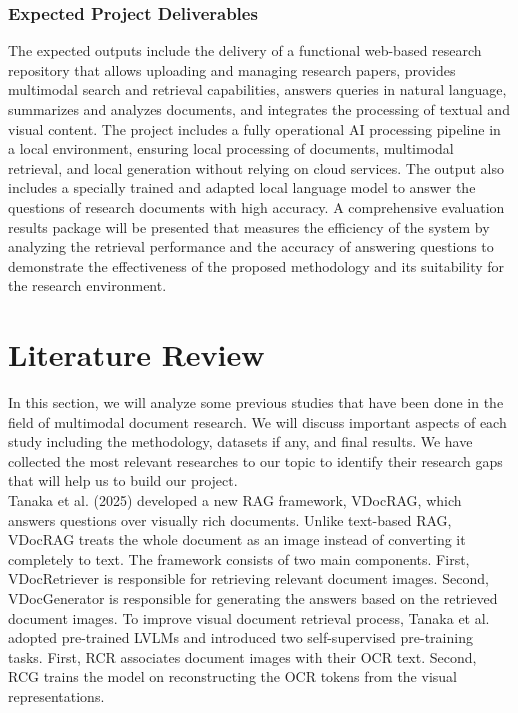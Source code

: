 \documentclass[11pt,a4paper]{report}
\begin{document}
\subsubsection{Expected Project Deliverables}
The expected outputs include the delivery of a functional web-based research repository that allows uploading and managing research papers, provides multimodal search and retrieval capabilities, answers queries in natural language, summarizes and analyzes documents, and integrates the processing of textual and visual content. The project includes a fully operational \ac{AI} processing pipeline in a local environment, ensuring local processing of documents, multimodal retrieval, and local generation without relying on cloud services. The output also includes a specially trained and adapted local language model to answer the questions of research documents with high accuracy. A comprehensive evaluation results package will be presented that measures the efficiency of the system by analyzing the retrieval performance and the accuracy of answering questions to demonstrate the effectiveness of the proposed methodology and its suitability for the research environment.

\cleardoublepage
\section{Literature Review}
In this section, we will analyze some previous studies that have been done in the field of multimodal document research. We will discuss important aspects of each study including the methodology, datasets if any, and final results. We have collected the most relevant researches to our topic to identify their research gaps that will help us to build our project.\\

Tanaka et al. \cite{Tanaka2025VDocRAGRG} (2025) developed a new \ac{RAG} framework, VDocRAG, which answers questions over visually rich documents. Unlike text-based \ac{RAG}, VDocRAG treats the whole document as an image instead of converting it completely to text. The framework consists of two main components. First, VDocRetriever is responsible for retrieving relevant document images. Second, VDocGenerator is responsible for generating the answers based on the retrieved document images. To improve visual document retrieval process, Tanaka et al. \cite{Tanaka2025VDocRAGRG} adopted pre-trained \ac{LVLMs} and introduced two self-supervised pre-training tasks. First, \ac{RCR} associates document images with their \ac{OCR} text. Second, \ac{RCG} trains the model on reconstructing the \ac{OCR} tokens from the visual representations.\\
\end{document}
